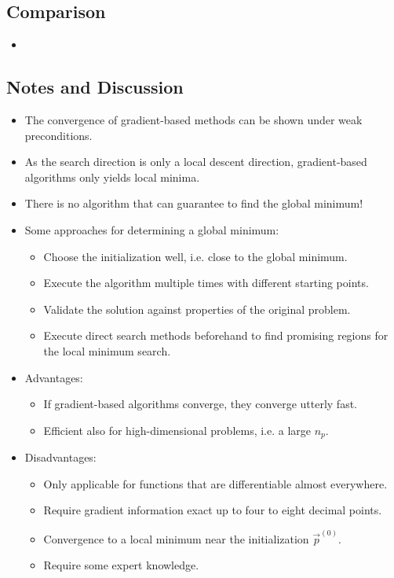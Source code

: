 		\subsection{Comparison} %
			
			\begin{itemize}
				\item 
			\end{itemize}
		
		\subsection{Notes and Discussion}
			\begin{itemize}
				\item The convergence of gradient-based methods can be shown under weak preconditions.
				\item As the search direction is only a local descent direction, gradient-based algorithms only yields local minima.
				\item There is no algorithm that can guarantee to find the global minimum!
				\item Some approaches for determining a global minimum:
					\begin{itemize}
						\item Choose the initialization well, i.e. close to the global minimum.
						\item Execute the algorithm multiple times with different starting points.
						\item Validate the solution against properties of the original problem.
						\item Execute direct search methods beforehand to find promising regions for the local minimum search.
					\end{itemize}
			\end{itemize}
		
			\begin{itemize}
				\item Advantages:
					\begin{itemize}
						\item If gradient-based algorithms converge, they converge utterly fast.
						\item Efficient also for high-dimensional problems, i.e. a large \( n_p \).
					\end{itemize}
				\item Disadvantages:
					\begin{itemize}
						\item Only applicable for functions that are differentiable almost everywhere.
						\item Require gradient information exact up to four to eight decimal points.
						\item Convergence to a local minimum near the initialization \( \vec{p}^{(0)} \).
						\item Require some expert knowledge.
					\end{itemize}
			\end{itemize}

